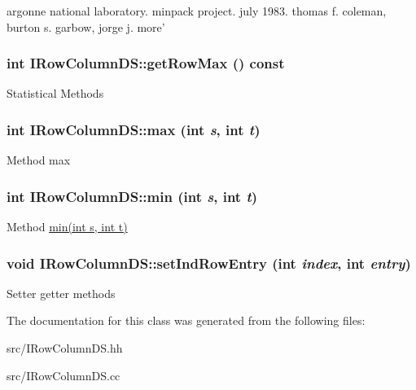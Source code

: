 argonne national laboratory. minpack project. july 1983. thomas f. coleman, burton s. garbow, jorge j. more'\hypertarget{classIRowColumnDS_a293b0ef58ea2e3e0ea7cf73fd32e17a8}{
\subsubsection[{getRowMax}]{\setlength{\rightskip}{0pt plus 5cm}int IRowColumnDS::getRowMax () const}}
\label{classIRowColumnDS_a293b0ef58ea2e3e0ea7cf73fd32e17a8}
Statistical Methods \hypertarget{classIRowColumnDS_a29f440baacbd3f0cb4729ba9e868f2ae}{
\subsubsection[{max}]{\setlength{\rightskip}{0pt plus 5cm}int IRowColumnDS::max (int {\em s}, \/  int {\em t})}}
\label{classIRowColumnDS_a29f440baacbd3f0cb4729ba9e868f2ae}
Method max \hypertarget{classIRowColumnDS_ac7f6fa1d2c803ae267146dec1cb129c7}{
\subsubsection[{min}]{\setlength{\rightskip}{0pt plus 5cm}int IRowColumnDS::min (int {\em s}, \/  int {\em t})}}
\label{classIRowColumnDS_ac7f6fa1d2c803ae267146dec1cb129c7}
Method \hyperlink{classIRowColumnDS_ac7f6fa1d2c803ae267146dec1cb129c7}{min(int s, int t)} \hypertarget{classIRowColumnDS_a83fbd9be18ddd86a224ef172ca7eec6b}{
\subsubsection[{setIndRowEntry}]{\setlength{\rightskip}{0pt plus 5cm}void IRowColumnDS::setIndRowEntry (int {\em index}, \/  int {\em entry})}}
\label{classIRowColumnDS_a83fbd9be18ddd86a224ef172ca7eec6b}
Setter getter methods 

The documentation for this class was generated from the following files:\begin{DoxyCompactItemize}
\item 
src/IRowColumnDS.hh\item 
src/IRowColumnDS.cc\end{DoxyCompactItemize}

